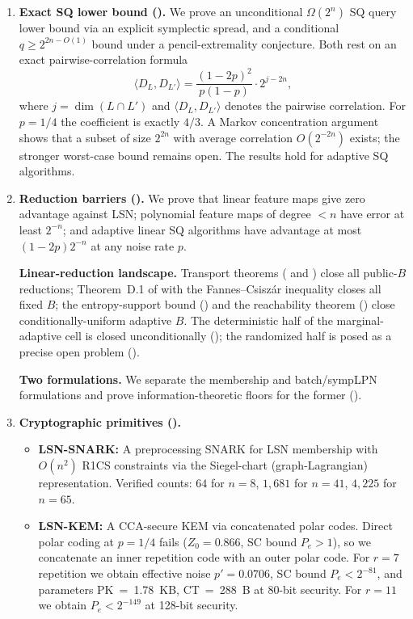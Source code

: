 \documentclass[11pt,a4paper]{article}
\theoremstyle{plain}
\theoremstyle{definition}
\begin{document}
\begin{enumerate}
    \item \textbf{Exact SQ lower bound ().} We prove an unconditional $\Omega(2^n)$ SQ query lower bound via an explicit symplectic spread, and a conditional $q \geq 2^{2n - O(1)}$ bound under a pencil-extremality conjecture. Both rest on an exact pairwise-correlation formula
    \[
    \langle D_L, D_{L'} \rangle = \frac{(1-2p)^2}{p(1-p)} \cdot 2^{j-2n},
    \]
    where $j = \dim(L \cap L')$ and $\langle D_L, D_{L'} \rangle$ denotes the pairwise correlation. For $p=1/4$ the coefficient is exactly $4/3$. A Markov concentration argument shows that a subset of size $2^{2n}$ with average correlation $O(2^{-2n})$ exists; the stronger worst-case bound remains open. The results hold for adaptive SQ algorithms.

    \item \textbf{Reduction barriers ().} We prove that linear feature maps give zero advantage against LSN; polynomial feature maps of degree $< n$ have error at least $2^{-n}$; and adaptive linear SQ algorithms have advantage at most $(1-2p)2^{-n}$ at any noise rate $p$.
    
    \textbf{Linear-reduction landscape.} Transport theorems ( and ) close all public-$B$ reductions; Theorem~D.1 of \cite{LPQR26} with the Fannes--Csisz\'ar inequality closes all fixed $B$; the entropy-support bound () and the reachability theorem () close conditionally-uniform adaptive $B$. The deterministic half of the marginal-adaptive cell is closed unconditionally (); the randomized half is posed as a precise open problem ().
    
    \textbf{Two formulations.} We separate the membership and batch/sympLPN formulations and prove information-theoretic floors for the former ().

    \item \textbf{Cryptographic primitives ().}
    \begin{itemize}
        \item \textbf{LSN-SNARK:} A preprocessing SNARK for LSN membership with $O(n^2)$ R1CS constraints via the Siegel-chart (graph-Lagrangian) representation. Verified counts: $64$ for $n=8$, $1{,}681$ for $n=41$, $4{,}225$ for $n=65$.
        \item \textbf{LSN-KEM:} A CCA-secure KEM via concatenated polar codes. Direct polar coding at $p=1/4$ fails ($Z_0 = 0.866$, SC bound $P_e > 1$), so we concatenate an inner repetition code with an outer polar code. For $r=7$ repetition we obtain effective noise $p' = 0.0706$, SC bound $P_e < 2^{-81}$, and parameters PK~=~1.78~KB, CT~=~288~B at 80-bit security. For $r=11$ we obtain $P_e < 2^{-149}$ at 128-bit security.
    \end{itemize}


\end{enumerate}
\end{document}
